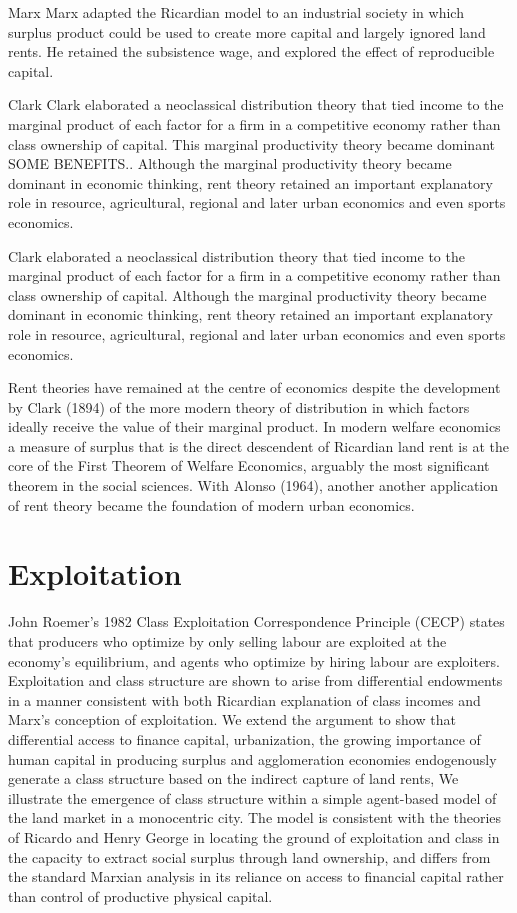 Marx
Marx adapted the Ricardian model to an industrial society in which surplus product could be used to create more capital and largely ignored land rents. He retained the subsistence wage, and explored the effect of reproducible capital.

Clark
Clark %
elaborated a neoclassical distribution theory that tied income to the marginal product of each factor for a firm in a competitive economy rather than class ownership of capital. 
This marginal productivity theory became dominant SOME BENEFITS.. Although the marginal productivity theory became dominant in economic thinking, rent theory retained an important explanatory role in resource, agricultural, regional and later urban economics and even sports economics. 

Clark %
elaborated a neoclassical distribution theory that tied income to the marginal product of each factor for a firm in a competitive economy rather than class ownership of capital. Although the marginal productivity theory became dominant in economic thinking, rent theory retained an important explanatory role in resource, agricultural, regional and later urban economics and even sports economics. 

Rent theories have remained at the centre of economics despite the development by Clark (1894) of the more modern theory of distribution in which factors ideally receive the value of their marginal product. In modern welfare economics a measure of surplus that is the direct descendent of Ricardian land rent is at the core of the First Theorem of Welfare Economics, arguably the most significant theorem in the social sciences. With Alonso (1964), another another application of rent theory became the foundation of modern urban economics.

\section{Exploitation}
John Roemer’s 1982 Class Exploitation Correspondence Principle (CECP) states that producers who optimize by only selling labour are exploited at the economy’s equilibrium, and agents who optimize by hiring labour are exploiters. Exploitation and class structure are shown to arise from differential endowments in a manner consistent with both Ricardian explanation of class incomes and Marx’s conception of exploitation. We extend the argument to show that differential access to finance capital, urbanization, the growing importance of human capital in producing surplus and agglomeration economies endogenously generate a class structure based on the indirect capture of land rents, We illustrate the emergence of class structure within a simple agent-based model of the land market in a monocentric city. The model is consistent with the theories of Ricardo and Henry George in locating the ground of exploitation and class in the capacity to extract social surplus through land ownership, and differs from the standard Marxian analysis in its reliance on access to financial capital rather than control of productive physical capital.


